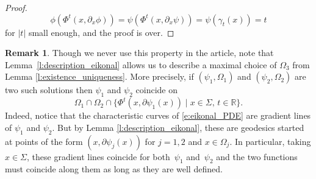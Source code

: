 \documentclass[JEP,XML,SOM,Unicode,published]{cedram}
\let\sep\mid
\theoremstyle{plain}
\theoremstyle{definition}
\newtheorem{remark}[theorem]{Remark}
\newcommand{\R}{\mathbb{R}}
\begin{document}
\begin{appendix}
\begin{proof}
\[
\phi(\Phi^t(x,\partial_x\phi))=\psi(\Phi^t(x,\partial_x\psi))=\psi(\gamma_t(x))=t
\]
for $|t|$ small enough, and the proof is over.
\end{proof}
\begin{remark}
Though we never use this property in the article, note that Lem\-ma~\ref{l:description_eikonal} allows us to describe a maximal choice of $\Omega_3$ from Lemma \ref{l:existence_uniqueness}. More precisely, if $(\psi_1,\Omega_1)$ and $(\psi_2,\Omega_2)$ are two such solutions then $\psi_1$ and $\psi_2$ coincide on
\[
\Omega_1\cap \Omega_2\cap\{\Phi^t(x,\partial\psi_1(x))\sep x\in\Sigma,\, t\in\R\}.
\]
Indeed, notice that the characteristic curves of \eqref{e:eikonal_PDE} are gradient lines of $\psi_1$ and $\psi_2$. But by Lemma \ref{l:description_eikonal}, these are geodesics started at points of the form $(x,\partial\psi_j(x))$ for $j=1,2$ and $x\in\Omega_j$. In particular, taking $x\in\Sigma$, these gradient lines coincide for both~$\psi_1$ and~$\psi_2$ and the two functions must coincide along them as long as they are well defined.
\end{remark}
\end{appendix}




\end{document}
